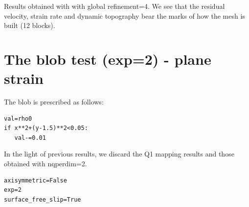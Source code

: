 \begin{center}
{\captionfont Results obtained with \aspect with global refinement=4. We see that the residual 
velocity, strain rate and dynamic topography bear the marks of how the mesh is built (12 blocks).}
\end{center}



\newpage
\section*{The blob test (exp=2) - plane strain}

The blob is prescribed as follows:
\begin{lstlisting}
val=rho0
if x**2+(y-1.5)**2<0.05:
   val-=0.01
\end{lstlisting}

In the light of previous results, we discard the Q1 mapping results 
and those obtained with {\python nqperdim=2}.

\begin{lstlisting}
axisymmetric=False
exp=2
surface_free_slip=True
\end{lstlisting}


